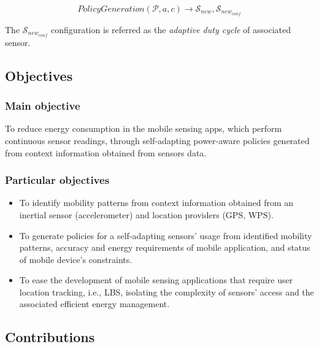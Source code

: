 \documentclass[ENG,PhD]{cinvestav}
\begin{document}
\begin{equation}
  PolicyGeneration( \mathcal{P}, a, c ) \longrightarrow{} \mathcal{S}_{new}, \mathcal{S}_{new_{conf}}
\end{equation}

The $\mathcal{S}_{new_{conf}}$ configuration is referred as the \emph{adaptive duty cycle} of associated sensor.


\subsection{Objectives} 
\label{sub:objectives}

\subsubsection*{Main objective}
\label{ssub:main_objective}
To reduce energy consumption in the mobile sensing apps, which perform continuous sensor readings, through self-adapting power-aware policies generated from context information obtained from sensors data.

\subsubsection*{Particular objectives} 
\label{ssub:particular_objectives}
\begin{itemize}
  \item To identify mobility patterns from context information obtained from an inertial sensor (accelerometer) and location providers (GPS, WPS).
  \item To generate policies for a self-adapting sensors' usage from identified mobility patterns, accuracy and energy requirements of mobile application, and status of mobile device's constraints. 
  \item To ease the development of mobile sensing applications that require user location tracking, i.e., LBS, isolating the complexity of sensors' access and the associated efficient energy management.
\end{itemize}


\subsection{Contributions} 
\label{sub:contributions}
\end{document}
